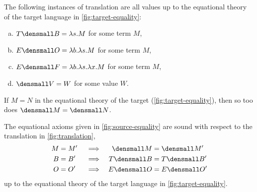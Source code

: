 \begin{lemma}
  The following instances of translation are all values up to the equational
  theory of the target language in \cref{fig:target-equality}:
  \begin{enumerate}[(a)]
  \item $T\den{B} = \lambda s. M$ for some term $M$,
  \item $E\den{O} = \lambda b. \lambda s. M$ for some term $M$,
  \item $E\den{F} = \lambda b. \lambda s. \lambda x. M$ for some term $M$,
  \item $\den{V} = W$ for some value $W$.
  \end{enumerate}
\end{lemma}

\begin{proposition}
  If $M = N$ in the equational theory of the target
  (\cref{fig:target-equality}), then so too does $\den{M} = \den{N}$.
\end{proposition}

\begin{proposition}[Soundness]
  The equational axioms given in \cref{fig:source-equality} are sound with
  respect to the translation in \cref{fig:translation},
  \begin{align*}
    M &= M' &&\implies & \den{M} &= \den{M'} \\
    B &= B' &&\implies & T\den{B} &= T\den{B'} \\
    O &= O' &&\implies & E\den{O} &= E\den{O'}
  \end{align*}
  up to the equational theory of the target language in
  \cref{fig:target-equality}.
\end{proposition}


